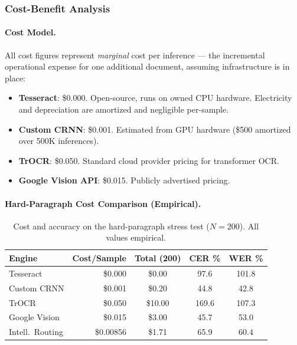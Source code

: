 \documentclass[12pt,a4paper]{article}
\begin{document}
\subsubsection{Cost-Benefit Analysis}
\label{sec:cost_model}

\paragraph{Cost Model.}
All cost figures represent \emph{marginal} cost per inference ---
the incremental operational expense for one additional document,
assuming infrastructure is in place:

\begin{itemize}
  \item \textbf{Tesseract}: \$0.000. Open-source, runs on owned CPU
    hardware. Electricity and depreciation are amortized and
    negligible per-sample.
  \item \textbf{Custom CRNN}: \$0.001. Estimated from GPU hardware
    (\$500 amortized over 500K inferences).
  \item \textbf{TrOCR}: \$0.050. Standard cloud provider pricing for
    transformer OCR.
  \item \textbf{Google Vision API}: \$0.015. Publicly advertised
    pricing.
\end{itemize}

\paragraph{Hard-Paragraph Cost Comparison (Empirical).}

\begin{table}[H]
  \centering
  \small
  \begin{tabular}{lrccc}
    \toprule
    \textbf{Engine} & \textbf{Cost/Sample}
    & \textbf{Total (200)} & \textbf{CER \%}
    & \textbf{WER \%} \\
    \midrule
    Tesseract      & \$0.000   & \$0.00  & 97.6  & 101.8 \\
    Custom CRNN    & \$0.001   & \$0.20  & 44.8  & 42.8  \\
    TrOCR          & \$0.050   & \$10.00 & 169.6 & 107.3 \\
    Google Vision  & \$0.015   & \$3.00  & 45.7  & 53.0  \\
    Intell.\ Routing & \$0.00856 & \$1.71 & 65.9  & 60.4  \\
    \bottomrule
  \end{tabular}
  \caption{Cost and accuracy on the hard-paragraph stress test
    ($N=200$). All values empirical.}
  \label{tab:cost_hard}
\end{table}
\end{document}
